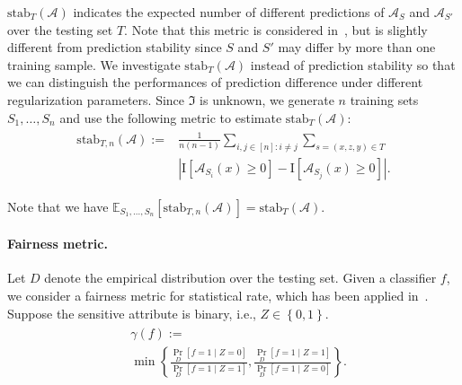 \documentclass[11pt]{article}
\newcommand{\Exp}{\mathbb{E}}
\newcommand{\I}{\mathrm{I}}
\newcommand{\calA}{\mathcal{A}}
\begin{document}
$\mathrm{stab}_T(\calA)$ indicates the expected number of different predictions of $\calA_S$ and $\calA_{S'}$ over the testing set $T$.
%
Note that this metric is considered in~\cite{friedler2018comparative}, but is slightly different from prediction stability since $S$ and $S'$ may differ by more than one training sample.
%
%
% 
We investigate $\mathrm{stab}_T(\calA)$ instead of prediction stability so that we can distinguish the performances of prediction difference under different regularization parameters.
% 
Since $\Im$ is unknown, we generate $n$ training sets $S_1,\ldots,S_{n}$ and use the following metric to estimate $\mathrm{stab}_T(\calA)$:
\begin{eqnarray}
\label{eq:stability}
\begin{split}
\mathrm{stab}_{T,n}(\calA):=& \frac{1}{n(n-1)} \sum_{i,j\in [n]: i\neq j}  \sum_{s=(x,z,y)\in T}\\
&\left| \I\left[\calA_{S_i}(x)\geq 0\right]- \I\left[\calA_{S_j}(x)\geq 0\right] \right|.
\end{split}
\end{eqnarray}

% 
Note that we have $\Exp_{S_1,\ldots,S_n}\left[\mathrm{stab}_{T,n}(\calA)\right]=\mathrm{stab}_{T}(\calA)$.
%
%

\vspace{-3mm}

\paragraph{Fairness metric.} Let $D$ denote the empirical distribution over the testing set.
%
Given a classifier $f$, we consider a fairness metric for statistical rate, which has been applied in~\cite{menon2018the,agarwal2018reductions}.
%
Suppose the sensitive attribute is binary, i.e., $Z\in \left\{0,1\right\}$.
%
\begin{eqnarray}
\label{eq:gamma}
\begin{split}
&\gamma(f):=\\
&\min\left\{\frac{\Pr_D\left[f=1\mid Z=0\right]}{\Pr_D\left[f=1\mid Z=1\right]},\frac{\Pr_D\left[f=1\mid Z=1\right]}{\Pr_D\left[f=1\mid Z=0\right]} \right\}.
\end{split}
\end{eqnarray}
\end{document}
